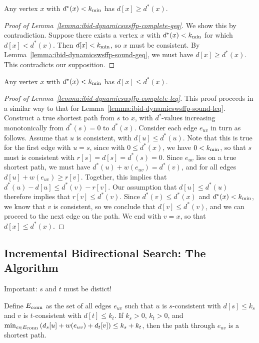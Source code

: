 \begin{lemma}
Any vertex $x$ with $d^*(x) < k_{\mbox{\scriptsize min}}$
has $d[x] \geq d^*(x)$.
\label{lemma:ibid-dynamicswsffp-complete-geq}
\end{lemma}

\begin{proof}[Proof of Lemma~\ref{lemma:ibid-dynamicswsffp-complete-geq}]
We show this by contradiction.
Suppose there exists a vertex $x$ with $d^*(x) < k_{\mbox{\scriptsize min}}$
for which $d[x] < d^*(x)$.
Then $d[x] < k_{\mbox{\scriptsize min}}$,
so $x$ must be consistent.
By Lemma~\ref{lemma:ibid-dynamicswsffp-sound-geq},
we must have $d[x] \geq d^*(x)$.
This contradicts our supposition.
\end{proof}

\begin{lemma}
Any vertex $x$ with $d^*(x) < k_{\mbox{\scriptsize min}}$
has $d[x] \leq d^*(x)$.
\label{lemma:ibid-dynamicswsffp-complete-leq}
\end{lemma}

\begin{proof}[Proof of Lemma~\ref{lemma:ibid-dynamicswsffp-complete-leq}]
This proof proceeds in a similar way to that for
Lemma~\ref{lemma:ibid-dynamicswsffp-sound-leq}.
Construct a true shortest path from $s$ to $x$,
with $d^*$-values increasing monotonically from
$d^*(s) = 0$ to $d^*(x)$.
Consider each edge $e_{uv}$ in turn as follows.
Assume that $u$ is consistent,
with $d[u] \leq d^*(u)$.
Note that this is true for the first edge with $u = s$,
since with $0 \leq d^*(x)$,
we have $0 < k_{\mbox{\scriptsize min}}$,
so that $s$ must is consistent with $r[s] = d[s] = d^*(s) = 0$.
Since $e_{uv}$ lies on a true shortest path,
we must have $d^*(u) + w(e_{uv}) = d^*(v)$,
and for all edges $d[u] + w(e_{uv}) \geq r[v]$.
Together, this implies that
$d^*(u) - d[u] \leq d^*(v) - r[v]$.
Our assumption that $d[u] \leq d^*(u)$
therefore implies that $r[v] \leq d^*(v)$.
Since $d^*(v) \leq d^*(x)$ and $d^*(x) < k_{\mbox{\scriptsize min}}$,
we know that $v$ is consistent,
so we conclude that $d[v] \leq d^*(v)$,
and we can proceed to the next edge on the path.
We end with $v = x$,
so that $d[x] \leq d^*(x)$.
\end{proof}

\subsection{Incremental Bidirectional Search: The Algorithm}

Important: $s$ and $t$ must be distict!

\begin{theorem}
Define $E_{\mbox{\scriptsize conn}}$ as the set of all edges $e_{uv}$ such that
$u$ is $s$-consistent with $d[s] \leq k_s$
and $v$ is $t$-consistent with $d[t] \leq k_t$.
If $k_s > 0$, $k_t > 0$,
and
$\min_{e \in E_{\mbox{\scriptsize conn}}} \left( d_s[u] + w(e_{uv}) + d_t[v] \right)
   \leq k_s + k_t$,
then the path through $e_{uv}$ is a shortest path.
\label{thm:ibid-sound}
\end{theorem}

